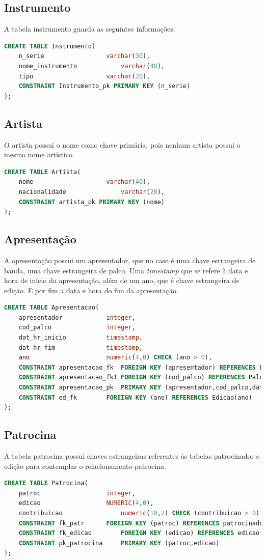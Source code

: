 \documentclass[12pt]{article}
\begin{document}
\subsection{Instrumento}
A tabela instrumento guarda as seguintes informações:
\begin{lstlisting}[language=sql]
CREATE TABLE Instrumento(
	n_serie					varchar(30),
	nome_instrumento			varchar(40),
	tipo					varchar(20),
	CONSTRAINT Instrumento_pk PRIMARY KEY (n_serie)
);
\end{lstlisting}
\subsection{Artista}
O artista possui o nome como chave primária, pois nenhum artista possui o mesmo nome artístico.
\begin{lstlisting}[language=sql]
CREATE TABLE Artista(
	nome					varchar(40),
	nacionalidade				varchar(20),
	CONSTRAINT artista_pk PRIMARY KEY (nome)
);
\end{lstlisting}

\subsection{Apresentação}
A apresentação possui um apresentador, que no caso é uma chave estrangeira de banda, uma chave estrangeira de palco. Uma \textit{timestamp} que se refere à data e hora de início da apresentação, além de um ano, que é chave estrangeira de edição. E por fim a data e hora do fim da apresentação.
\begin{lstlisting}[language=sql]
CREATE TABLE Apresentacao(
	apresentador			integer,
	cod_palco 				integer,
	dat_hr_inicio			timestamp,
	dat_hr_fim				timestamp,
	ano 					numeric(4,0) CHECK (ano > 0),
	CONSTRAINT apresentacao_fk  FOREIGN KEY (apresentador) REFERENCES Banda(cod),
	CONSTRAINT apresentacao_fk1 FOREIGN KEY (cod_palco) REFERENCES Palco(cod),
	CONSTRAINT apresentacao_pk  PRIMARY KEY (apresentador,cod_palco,dat_hr_inicio),
	CONSTRAINT ed_fk	    FOREIGN KEY (ano) REFERENCES Edicao(ano)
);
\end{lstlisting}
\subsection{Patrocina}
A tabela patrocina possui chaves estrangeiras referentes às tabelas patrocinador e edição para contemplar o relacionamento patrocina.
\begin{lstlisting}[language=sql]
CREATE TABLE Patrocina(
	patroc					integer,
	edicao					NUMERIC(4,0),
	contribuicao				numeric(10,2) CHECK (contribuicao > 0),
	CONSTRAINT fk_patr	 	FOREIGN KEY (patroc) REFERENCES patrocinador(cod),
	CONSTRAINT fk_edicao		FOREIGN KEY (edicao) REFERENCES edicao(ano),
	CONSTRAINT pk_patrocina 	PRIMARY KEY (patroc,edicao)	
);
\end{lstlisting}
\end{document}
